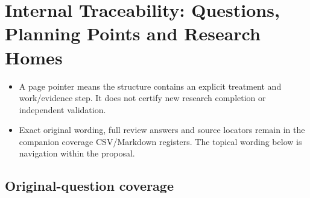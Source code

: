 \section{Internal Traceability: Questions, Planning Points and Research Homes}
\begin{itemize}[leftmargin=*]
\item A page pointer means the structure contains an explicit treatment and work/evidence step. It does not certify new research completion or independent validation.
\item Exact original wording, full review answers and source locators remain in the companion coverage CSV/Markdown registers. The topical wording below is navigation within the proposal.
\end{itemize}
\subsection{Original-question coverage}
\begingroup\small

